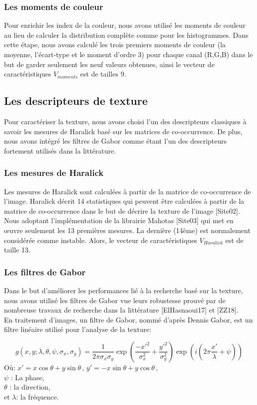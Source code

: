 \subsubsection{Les moments de couleur}
Pour enrichir les index de la couleur, nous avons utilisé les moments de couleur au lieu de calculer la distribution complète comme pour les histogrammes. Dans cette étape, nous avons calculé les trois premiers moments de couleur (la moyenne, l’écart-type et le moment d'ordre 3) pour chaque canal (R,G,B) dans le but de garder seulement les neuf valeurs obtenues, ainsi le vecteur de caractéristiques $ V_{moments} $ est de tailles 9.

\subsection{Les descripteurs de texture}
Pour caractériser la texture, nous avons choisi l'un des descripteurs classiques à savoir les mesures de Haralick basé sur les matrices de co-occurrence. De plus, nous avons intégré les filtres de Gabor comme étant l'un des descripteurs fortement utilisés dans la littérature.
\subsubsection{Les mesures de Haralick}
Les mesures de Haralick sont calculées à partir de la matrice de co-occurrence de l'image. Haralick décrit 14 statistiques qui peuvent être calculées à partir de la matrice de co-occurrence dans le but de décrire la texture de l'image [Site02]. Nous adoptant l'implémentation de la librairie Mahotas [Site03] qui met en œuvre seulement les 13 premières mesures. La dernière (14ème) est normalement considérée comme instable. Alors, le vecteur de caractéristiques $ V_{Haralick} $ est de taille 13.

\subsubsection{Les filtres de Gabor}
Dans le but d'améliorer les performances lié à la recherche basé sur la texture, nous avons utilisé les filtres de Gabor vue leurs robustesse prouvé par de nombreuse travaux de recherche dans la littérature [ElHasnaoui17] et [ZZ18].\\

En traitement d'images, un filtre de Gabor, nommé d'après Dennis Gabor, est un filtre linéaire utilisé pour l'analyse de la texture:

\begin{equation}
g(x,y;\lambda,\theta,\psi,\sigma_x,\sigma_y) = \frac{1}{2\pi \sigma_x \sigma_y} \exp\left(\frac{-x'^2}{\sigma_x^2} + \frac{y'^2}{\sigma_y^2}\right)\exp\left(i\left(2\pi\frac{x'}{\lambda}+\psi\right)\right) 
\end{equation}
Où: $ x' = x \cos\theta + y \sin\theta\, $, $ y' = -x \sin\theta + y \cos\theta\, $, \\
$\psi$ : La phase, \\
$\theta$ : la direction, \\
et $ \lambda $: la fréquence.\\

